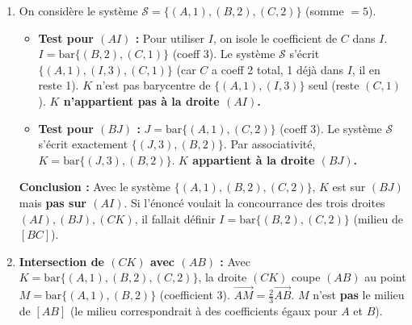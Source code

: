 \documentclass[11pt]{article}
\begin{document}
\begin{corrige}[Exercice 7]
\begin{enumerate}
\item On considère le système $\mathcal{S} = \{(A,1), (B,2), (C,2)\}$ (somme $=5$).
\begin{itemize}
\item \textbf{Test pour $(AI)$ :} Pour utiliser $I$, on isole le coefficient de $C$ dans $I$. $I = \mathrm{bar}\{(B,2),(C,1)\}$ (coeff 3). Le système $\mathcal{S}$ s'écrit $\{(A,1), (I,3), (C,1)\}$ (car $C$ a coeff 2 total, 1 déjà dans $I$, il en reste 1). $K$ n'est pas barycentre de $\{(A,1),(I,3)\}$ seul (reste $(C,1)$). \textbf{$K$ n'appartient pas à la droite $(AI)$.}
\item \textbf{Test pour $(BJ)$ :} $J = \mathrm{bar}\{(A,1),(C,2)\}$ (coeff 3). Le système $\mathcal{S}$ s'écrit exactement $\{(J,3), (B,2)\}$. Par associativité, $K = \mathrm{bar}\{(J,3),(B,2)\}$. \textbf{$K$ appartient à la droite $(BJ)$.}
\end{itemize}
\textbf{Conclusion :} Avec le système $\{(A,1),(B,2),(C,2)\}$, $K$ est sur $(BJ)$ mais \textbf{pas sur $(AI)$}. Si l'énoncé voulait la concourrance des trois droites $(AI), (BJ), (CK)$, il fallait définir $I=\mathrm{bar}\{(B,2),(C,2)\}$ (milieu de $[BC]$).

\item \textbf{Intersection de $(CK)$ avec $(AB)$ :} Avec $K=\mathrm{bar}\{(A,1),(B,2),(C,2)\}$, la droite $(CK)$ coupe $(AB)$ au point $M = \mathrm{bar}\{(A,1),(B,2)\}$ (coefficient $3$). $\overrightarrow{AM} = \frac{2}{3}\overrightarrow{AB}$. $M$ n'est \textbf{pas} le milieu de $[AB]$ (le milieu correspondrait à des coefficients égaux pour $A$ et $B$).
\end{enumerate}
\end{corrige}
\end{document}
